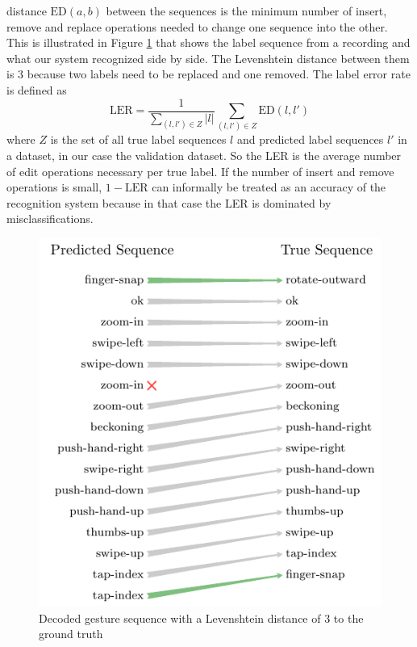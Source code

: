 \noindent
distance $\mathrm{ED}(a, b)$ between the sequences is the minimum number of
insert, remove and replace operations needed to change one sequence into the
other. This is illustrated in Figure \ref{fig:levenshtein} that shows the label
sequence from a recording and what our system recognized side by side. The
Levenshtein distance between them is 3 because two labels need to be replaced
and one removed. The label error rate is defined as
\begin{equation*}
  \mathrm{LER} = \frac{1}{\sum_{(l, l') \in Z} |l|} \sum_{(l, l') \in Z} \mathrm{ED}(l, l')
\end{equation*}
where $Z$ is the set of all true label sequences $l$ and predicted label
sequences $l'$ in a dataset, in our case the validation dataset. So the LER is
the average number of edit operations necessary per true label. If the number of
insert and remove operations is small, $1 - \mathrm{LER}$ can informally be
treated as an accuracy of the recognition system because in that case the LER is
dominated by misclassifications.

\begin{figure}[h]
  \centering
  \includegraphics{figures/results/levenshtein}
  \caption{Decoded gesture sequence with a Levenshtein distance of 3 to the
    ground truth}
  \label{fig:levenshtein}
\end{figure}

